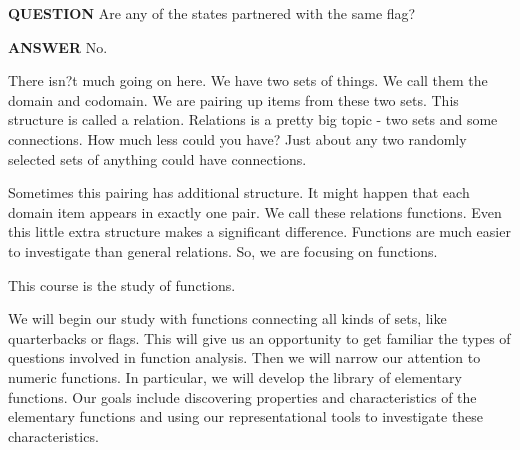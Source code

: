 \documentclass{ximera}
\begin{document}
\begin{dialogue}
\item [\textbf{QUESTION}] Are any of the states partnered with the same flag?
\item [\textbf{ANSWER}]    No.
\end{dialogue}







There isn?t much going on here. We have two sets of things. We call them the domain and codomain. We are pairing up items from these two sets. This structure is called a relation. Relations is a pretty big topic - two sets and some connections. How much less could you have? Just about any two randomly selected sets of anything could have connections.

Sometimes this pairing has additional structure. It might happen that each domain item appears in exactly one pair. We call these relations functions.  Even this little extra structure makes a significant difference. Functions are much easier to investigate than general relations. So, we are focusing on functions.

This course is the study of functions. 

We will begin our study with functions connecting all kinds of sets, like quarterbacks or flags.  This will give us an opportunity to get familiar the types of questions involved in function analysis. Then we will narrow our attention to numeric functions. In particular, we will develop the library of elementary functions. Our goals include discovering properties and characteristics of the elementary functions and using our representational tools to investigate these characteristics.
\end{document}
